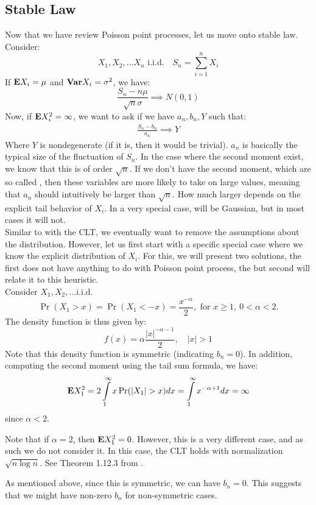 \documentclass[../main/main.tex]{subfiles}
\begin{document}
\subsection{Stable Law}
Now that we have review Poisson point processes, let us move onto stable law. Consider: \[
	X_1, X_2, \ldots X_n \text{ i.i.d.} \quad S_n = \sum\limits_{i=1}^{n} X_i
\]
If $\text{\textbf{E}} X_i = \mu$ and $\text{\textbf{Var}} X_i = \sigma^2$, we have: \[
	\frac{S_{n}-n \mu}{\sqrt{n} \sigma} \implies N(0,1)
\]
Now, if $\text{\textbf{E}} X^2_i = \infty$, we want to ask if we have $a_n, b_n, Y$ such that:
\begin{align}\label{28:eq1}
	\frac{S_n - b_n}{a_n} \implies Y
\end{align}
Where $Y$ is nondegenerate (if it is, then it would be trivial). $a_n$ is basically the typical size of the fluctuation of $S_n$. In the case where the second moment exist, we know that this is of order $\sqrt{n}$. If we don't have the second moment, which are so called , then these variables are more likely to take on large values, meaning that $a_n$ should intuitively be larger than $\sqrt{n}$. How much larger depends on the explicit tail behavior of $X_i$. In a very special case, \label{28:eq1} will be Gaussian, but in most cases it will not.\\

Similar to with the CLT, we eventually want to remove the assumptions about the distribution. However, let us first start with a specific special case where we know the explicit distribution of $X_i$. For this, we will present two solutions, the first does not have anything to do with Poisson point process, the but second will relate it to this heuristic.\\

Consider \( X_1, X_2, \ldots  \text{i.i.d.} \) \[
	\Pr(X_1 > x) = \Pr(X_1 < -x) = \frac{x^{-\alpha}}{2}, \text{ for } x \geq 1,~ 0<\alpha<2.
\]
The density function is thus given by: \[
	f(x) = \alpha \frac{|x|^{-\alpha-1}}{2},\quad |x| > 1
\]
Note that this density function is symmetric (indicating $b_n = 0$). In addition, computing the second moment using the tail sum formula, we have: \[
	\E X^2_1 = 2 \int\limits_{1}^{\infty}x \Pr(|X_1|>x) dx = \int\limits_{1}^{\infty}x^{-\alpha + 1 }dx = \infty
\] since $\alpha < 2$.
\begin{remark}
	Note that if $\alpha = 2$, then $\text{\textbf{E}} X_1^2 = 0$. However, this is a very different case, and as such we do not consider it. In this case, the CLT holds with normalization $\sqrt{n \log n}$. See Theorem 1.12.3 from \cite{Uch11}.
\end{remark}
\begin{remark}
	As mentioned above, since this is symmetric, we can have $b_n=0$. This suggests that we might have non-zero $b_n$ for non-symmetric cases.
\end{remark}
\end{document}
